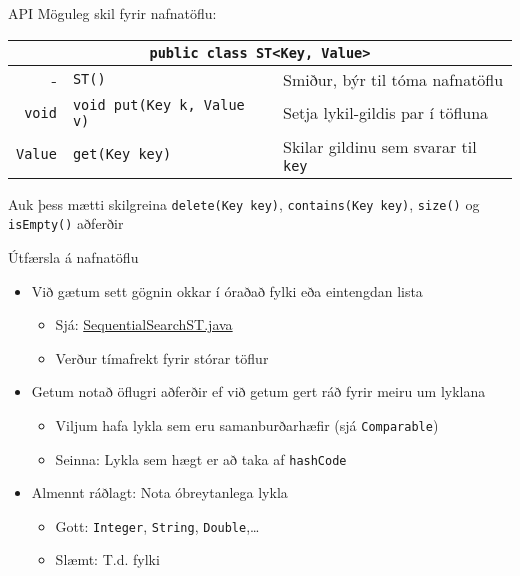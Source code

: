 \documentclass{beamer}
\begin{document}
\begin{frame}{API}
Möguleg skil fyrir nafnatöflu:
\begin{center}
\begin{tabularx}{\textwidth}{rlX}
\toprule
\multicolumn{3}{c}{\texttt{public class ST<Key, Value>}}\\
\midrule
-&\texttt{ST()}& Smiður, býr til tóma nafnatöflu\\
\texttt{void}&\texttt{void put(Key k, Value v)}&Setja lykil-gildis par í töfluna\\
\texttt{Value}&\texttt{get(Key key)}&Skilar gildinu sem svarar til \texttt{key}\\
\bottomrule
\end{tabularx}
\end{center}
Auk þess mætti skilgreina \texttt{delete(Key key)}, \texttt{contains(Key\ key)}, \texttt{size()} og \texttt{isEmpty()} aðferðir
\end{frame}

\begin{frame}{Útfærsla á nafnatöflu}
\begin{itemize}
 \item Við gætum sett gögnin okkar í óraðað fylki eða eintengdan lista
 \begin{itemize}
  \item Sjá: \href{http://algs4.cs.princeton.edu/code/edu/princeton/cs/algs4/SequentialSearchST.java.html}{SequentialSearchST.java}
  \item Verður tímafrekt fyrir stórar töflur
 \end{itemize}
 \item Getum notað öflugri aðferðir ef við getum gert ráð fyrir meiru um lyklana
 \begin{itemize}
  \item Viljum hafa lykla sem eru samanburðarhæfir (sjá \texttt{Comparable})
  \item Seinna: Lykla sem hægt er að taka af \texttt{hashCode}
 \end{itemize}
 \item Almennt ráðlagt: Nota óbreytanlega  lykla
 \begin{itemize}
  \item Gott: \texttt{Integer}, \texttt{String}, \texttt{Double},\ldots
  \item Slæmt: T.d. fylki
 \end{itemize}
\end{itemize}
\end{frame}
\end{document}
